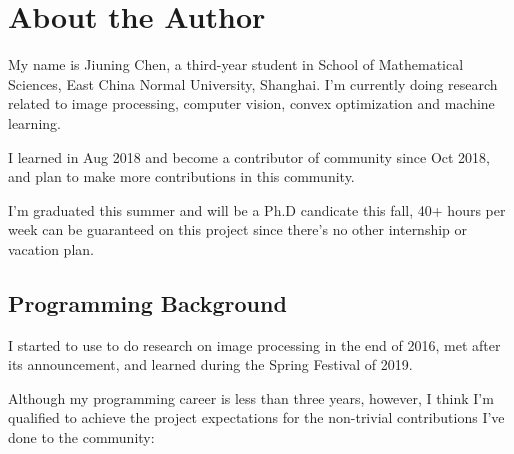 
\section{About the Author}\label{sec:about_author}

My name is \textsf{Jiuning Chen}, a third-year student in School of Mathematical Sciences, East China Normal University, Shanghai. I'm currently doing research related to image processing, computer vision, convex optimization and machine learning.\par

I learned \langjulia in Aug 2018 and become a contributor of \langjulia community since Oct 2018, and plan to make more contributions in this community.\par

I'm graduated this summer and will be a Ph.D candicate this fall, 40+ hours per week can be guaranteed on this project since there's no other internship or vacation plan.\par

\subsection*{Programming Background}

I started to use \langmatlab to do research on image processing in the end of 2016, met  \langjulia after its  announcement, and learned \langpython during the Spring Festival of 2019. \par

Although my programming career is less than three years, however, I think I'm qualified to achieve the project expectations for the non-trivial contributions I've done to the \langjulia{} community:

